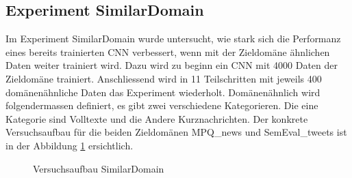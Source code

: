 \subsection{Experiment SimilarDomain}
Im Experiment SimilarDomain wurde untersucht, wie stark sich die Performanz eines bereits trainierten CNN verbessert, wenn mit der Zieldomäne ähnlichen Daten weiter trainiert wird. Dazu wird zu beginn ein CNN mit 4000 Daten der Zieldomäne trainiert. Anschliessend wird in 11 Teilschritten mit jeweils 400 domänenähnliche Daten das Experiment wiederholt.
Domänenähnlich wird folgendermassen definiert, es gibt zwei verschiedene Kategorieren. Die eine Kategorie sind Volltexte und die Andere Kurznachrichten.
Der konkrete Versuchsaufbau für die beiden Zieldomänen MPQ\_news und SemEval\_tweets ist in der Abbildung \ref{fig:Method_SimilarDomain} ersichtlich.
\begin{figure}[H]
	\centering
	\caption{Versuchsaufbau SimilarDomain}
	\label{fig:Method_SimilarDomain}
\end{figure}

